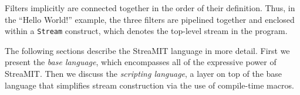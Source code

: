 Filters implicitly are connected together in the order of their
definition.  Thus, in the ``Hello World!'' example, the three filters
are pipelined together and enclosed within a {\tt Stream} construct,
which denotes the top-level stream in the program.

The following sections describe the StreaMIT language in more detail.
First we present the {\it base language}, which encompasses all of the
expressive power of StreaMIT.  Then we discuss the {\it scripting
language}, a layer on top of the base language that simplifies stream
construction via the use of compile-time macros.


